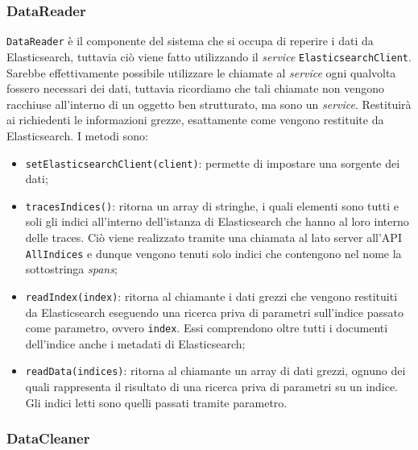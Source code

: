 \subsubsection{DataReader}
\label{sec:DataReader}
\texttt{DataReader} è il componente del sistema che si occupa di reperire i dati da Elasticsearch, tuttavia ciò viene fatto utilizzando il \emph{service} \texttt{ElasticsearchClient}. Sarebbe effettivamente possibile utilizzare le chiamate al \emph{service} ogni qualvolta fossero necessari dei dati, tuttavia ricordiamo che tali chiamate non vengono racchiuse all'interno di un oggetto ben strutturato, ma sono un \emph{service}. Restituirà ai richiedenti le informazioni grezze, esattamente come vengono restituite da Elasticsearch. I metodi sono: 
 

\begin{itemize}
	\item \texttt{setElasticsearchClient(client)}: permette di impostare una sorgente dei dati;
	\item \texttt{tracesIndices()}: ritorna un array di stringhe, i quali elementi sono tutti e soli gli indici all'interno dell'istanza di Elasticsearch che hanno al loro interno delle traces. Ciò viene realizzato tramite una chiamata al lato server all'API \texttt{AllIndices} e dunque vengono tenuti solo indici che contengono nel nome la sottostringa \emph{spans};
	\item \texttt{readIndex(index)}: ritorna al chiamante i dati grezzi che vengono restituiti da Elasticsearch eseguendo una ricerca priva di parametri sull'indice passato come parametro, ovvero \texttt{index}. Essi comprendono oltre tutti i documenti dell'indice anche i metadati di Elasticsearch;
	\item \texttt{readData(indices)}: ritorna al chiamante un array di dati grezzi, ognuno dei quali rappresenta il risultato di una ricerca priva di parametri su un indice. Gli indici letti sono quelli passati tramite parametro.


\end{itemize}



\subsubsection{DataCleaner}

